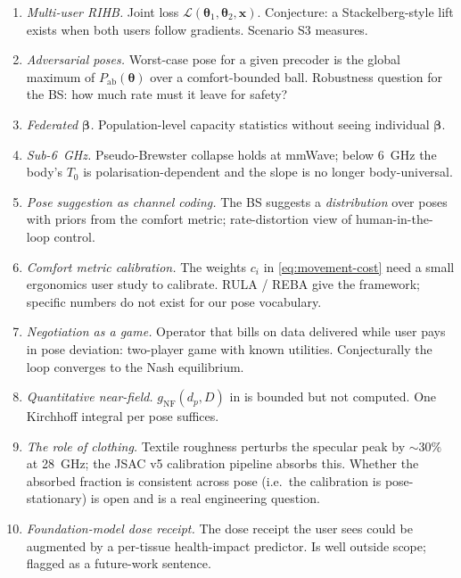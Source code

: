 \documentclass[11pt,a4paper]{article}
\theoremstyle{definition}
\newcommand{\xvec}{\mathbf{x}}
\newcommand{\thetab}{\bm{\theta}}
\newcommand{\betab}{\bm{\beta}}
\newcommand{\Pabs}{P_{\mathrm{ab}}}
\begin{document}
\begin{enumerate}[leftmargin=1.6em,itemsep=3pt]
\item \emph{Multi-user RIHB.}  Joint loss
$\mathcal{L}(\thetab_1,\thetab_2,\xvec)$.  Conjecture: a
Stackelberg-style lift exists when both users follow gradients.
Scenario S3 measures.
\item \emph{Adversarial poses.}  Worst-case pose for a given
precoder is the global maximum of $\Pabs(\thetab)$ over a
comfort-bounded ball.  Robustness question for the BS: how much
rate must it leave for safety?
\item \emph{Federated $\betab$.}  Population-level capacity
statistics without seeing individual $\betab$.
\item \emph{Sub-\SI{6}{GHz}.}  Pseudo-Brewster collapse holds at
mmWave; below \SI{6}{GHz} the body's $T_0$ is
polarisation-dependent and the slope is no longer body-universal.
\item \emph{Pose suggestion as channel coding.}  The BS suggests
a \emph{distribution} over poses with priors from the comfort
metric; rate-distortion view of human-in-the-loop control.
\item \emph{Comfort metric calibration.}  The weights $c_i$ in
\eqref{eq:movement-cost} need a small ergonomics user study to
calibrate.  RULA / REBA give the framework; specific numbers do
not exist for our pose vocabulary.
\item \emph{Negotiation as a game.}  Operator that bills on data
delivered while user pays in pose deviation: two-player game with
known utilities.  Conjecturally the loop converges to the Nash
equilibrium.
\item \emph{Quantitative near-field.}  $g_{\mathrm{NF}}(d_p,D)$ in
 is bounded but not computed.  One Kirchhoff
integral per pose suffices.
\item \emph{The role of clothing.}  Textile roughness perturbs the
specular peak by $\sim 30\%$ at \SI{28}{GHz}; the
JSAC v5 calibration pipeline absorbs this.  Whether the absorbed
fraction is consistent across pose (i.e.\ the calibration is
pose-stationary) is open and is a real engineering question.
\item \emph{Foundation-model dose receipt.}  The dose receipt the
user sees could be augmented by a per-tissue health-impact
predictor.  Is well outside scope; flagged as a future-work
sentence.
\end{enumerate}

\end{document}
